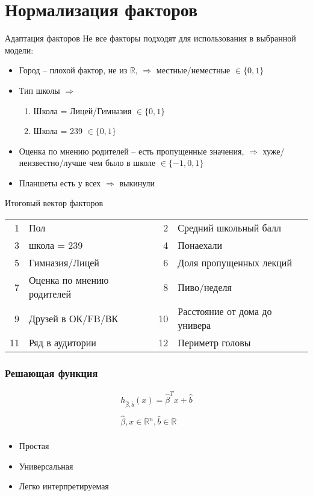 \documentclass[14pt, fleqn, xcolor={dvipsnames, table}, hyperref={unicode}, babel={english,russian}, inputenc=utf8x]{beamer}
\begin{document}
\section{Нормализация факторов}
\begin{frame}{Адаптация факторов}
Не все факторы подходят для использования в выбранной модели:
\begin{itemize}
  \item Город -- плохой фактор, не из $\mathbb{R}$, $\Rightarrow$ местные/неместные $\in \{0,1\}$
  \item Тип школы $\Rightarrow$
  \begin{enumerate}
    \item Школа = Лицей/Гимназия $\in \{0,1\}$
    \item Школа = 239 $\in \{0,1\}$
  \end{enumerate}
  \item Оценка по мнению родителей -- есть пропущенные значения, $\Rightarrow$ хуже/неизвестно/лучше чем было в школе $\in \{-1,0,1\}$
  \item Планшеты есть у всех $\Rightarrow$ выкинули
\end{itemize}
\end{frame}

\begin{frame}{Итоговый вектор факторов}
\begin{center}
\footnotesize
\begin{tabular}{rlrl}
1 & Пол & 2 & Средний школьный балл \\
3 & школа = 239 & 4 & Понаехали \\
5 & Гимназия/Лицей & 6 & Доля пропущенных лекций \\
7 & Оценка по мнению родителей & 8 & Пиво/неделя \\
9 & Друзей в ОК/FB/ВК & 10 & Расстояние от дома до универа \\
11 & Ряд в аудитории & 12 & Периметр головы
\end{tabular}
\end{center}
\end{frame}

\begin{frame}[t]\frametitle{Решающая функция}
    $$\begin{array}{c}
      h_{\hat{\beta},\hat{b}}(x) = \hat{\beta}^{T}x + \hat{b} \\
      \\
      \hat{\beta}, x \in \mathbb{R}^n, \hat{b} \in \mathbb{R} \\
      \end{array}
    $$
\begin{itemize}
  \item Простая
  \item Универсальная
  \item Легко интерпретируемая
\end{itemize}
\end{frame}
\end{document}
